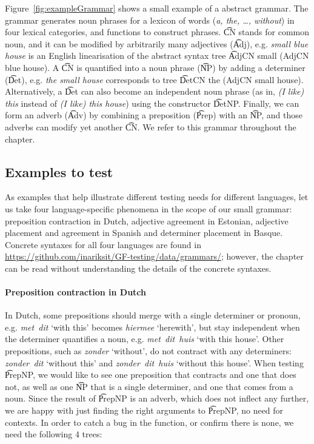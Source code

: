 Figure~\ref{fig:exampleGrammar} shows a small example of a \gf{}
abstract grammar. The grammar generates noun phrases for a lexicon of
\numOfLex{} words (\emph{a, the, \dots, without}) in four lexical
categories, and \numOfFun{} functions to construct phrases. \t{CN} stands
for common noun, and it can be modified by arbitrarily many adjectives
(\t{Adj}), e.g. \emph{small blue house} is an English linearisation of
the abstract syntax tree \t{AdjCN small (AdjCN blue house)}. A \t{CN}
is quantified into a noun phrase (\t{NP}) by adding a determiner
(\t{Det}), e.g. \emph{the small house} corresponds to tree \t{DetCN
  the (AdjCN small house)}. Alternatively, a \t{Det} can also become
an independent noun phrase (as in, \emph{(I like) this} instead of
\emph{(I like) this house}) using the constructor \t{DetNP}. Finally,
we can form an adverb (\t{Adv}) by combining a preposition (\t{Prep})
with an \t{NP}, and those adverbs can modify yet another \t{CN}.  We
refer to this grammar throughout the chapter.

\subsection{Examples to test}
\label{gf-testing-examples}

As examples that help illustrate different testing needs for different
languages, let us take four language-specific phenomena in the scope
of our small grammar: preposition contraction in Dutch, adjective
agreement in Estonian, adjective placement and agreement in Spanish
and determiner placement in Basque. Concrete syntaxes for all four
languages are found in
\url{https://github.com/inariksit/GF-testing/data/grammars/}; however,
the chapter can be read without understanding the details of the
concrete syntaxes.

\paragraph{Preposition contraction in Dutch} In Dutch, some prepositions should
merge with a single determiner or pronoun, e.g. \emph{met~dit} `with
this' becomes \emph{hiermee} `herewith', but stay independent when the
determiner quantifies a noun, e.g. \emph{met~dit~huis} `with this house'. 
Other prepositions, such as \emph{zonder} `without', do not
contract with any determiners: \emph{zonder~dit} `without this' and
\emph{zonder~dit~huis} `without this house'.
When testing \t{PrepNP}, we would like to see one preposition that
contracts and one that does not, as well as one \t{NP} that is a
single determiner, and one that comes from a noun. Since the result of
\t{PrepNP} is an adverb, which does not inflect any further, we are
happy with just finding the right arguments to \t{PrepNP}, no need for contexts.
In order to catch a bug in the function, or confirm there is none, we
need the following 4 trees: 

